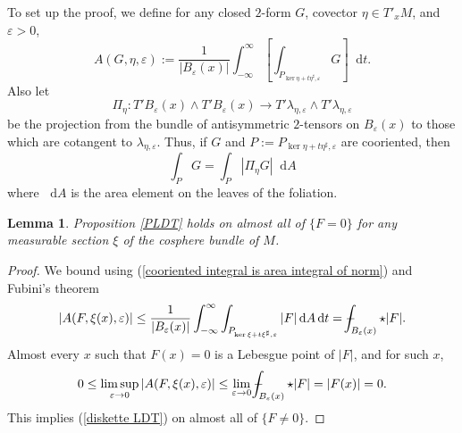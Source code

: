 \documentclass[reqno,11pt]{amsart}
\newcommand*\dif{\mathop{}\!\mathrm{d}}
\newtheorem{lemma}[theorem]{Lemma}
\theoremstyle{definition}
\numberwithin{equation}{section}
\def\Xint#1{\mathchoice
{\XXint\displaystyle\textstyle{#1}}%
{\XXint\textstyle\scriptstyle{#1}}%
{\XXint\scriptstyle\scriptscriptstyle{#1}}%
{\XXint\scriptscriptstyle\scriptscriptstyle{#1}}%
\!\int}
\def\XXint#1#2#3{{\setbox0=\hbox{$#1{#2#3}{\int}$ }
\vcenter{\hbox{$#2#3$ }}\kern-.6\wd0}}
\def\dashint{\Xint-}
\begin{document}
To set up the proof, we define for any closed $2$-form $G$, covector $\eta \in T'_x M$, and $\varepsilon > 0$,
$$A(G, \eta, \varepsilon) := \frac{1}{|B_\varepsilon(x)|} \int_{-\infty}^\infty \left[\int_{P_{\ker \eta + t\eta^\sharp, \varepsilon}} G\right] \dif t.$$
Also let 
$$\Pi_\eta: T' B_\varepsilon(x) \wedge T' B_\varepsilon(x) \to T' \lambda_{\eta, \varepsilon} \wedge T' \lambda_{\eta, \varepsilon}$$
be the projection from the bundle of antisymmetric $2$-tensors on $B_\varepsilon(x)$ to those which are cotangent to $\lambda_{\eta, \varepsilon}$.
Thus, if $G$ and $P := P_{\ker \eta + t\eta^\sharp, \varepsilon}$ are cooriented, then
\begin{equation}\label{cooriented integral is area integral of norm}
	\int_P G = \int_P |\Pi_\eta G| \dif A
\end{equation}
where $\dif A$ is the area element on the leaves of the foliation.

\begin{lemma}\label{PLDT nonzero}
Proposition \ref{PLDT} holds on almost all of $\{F = 0\}$ for any measurable section $\xi$ of the cosphere bundle of $M$.
\end{lemma}
\begin{proof}
We bound using (\ref{cooriented integral is area integral of norm}) and Fubini's theorem
$$|A(F, \xi(x), \varepsilon)| \leq \frac{1}{|B_\varepsilon(x)|} \int_{-\infty}^\infty \int_{P_{\ker \xi + t\xi^\sharp, \varepsilon}} |F| \dif A \dif t = \dashint_{B_\varepsilon(x)} \star |F|.$$
Almost every $x$ such that $F(x) = 0$ is a Lebesgue point of $|F|$, and for such $x$,
$$0 \leq \limsup_{\varepsilon \to 0} |A(F, \xi(x), \varepsilon)| \leq \lim_{\varepsilon \to 0} \dashint_{B_\varepsilon(x)} \star |F| = |F(x)| = 0.$$
This implies (\ref{diskette LDT}) on almost all of $\{F \neq 0\}$.
\end{proof}
\end{document}
